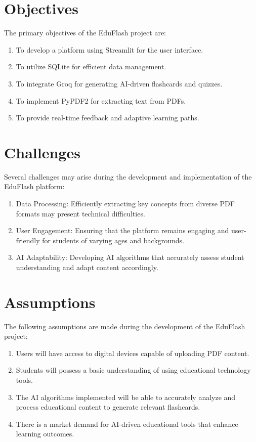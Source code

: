 \documentclass{report}
\begin{document}
\section{Objectives}
The primary objectives of the EduFlash project are:
\begin{enumerate}
    \item To develop a platform using Streamlit for the user interface.
    \item To utilize SQLite for efficient data management.
    \item To integrate Groq for generating AI-driven flashcards and quizzes.
    \item To implement PyPDF2 for extracting text from PDFs.
    \item To provide real-time feedback and adaptive learning paths.
\end{enumerate}

\section{Challenges}
Several challenges may arise during the development and implementation of the EduFlash platform:
\begin{enumerate}
    \item {Data Processing:} Efficiently extracting key concepts from diverse PDF formats may present technical difficulties.
    \item {User Engagement:} Ensuring that the platform remains engaging and user-friendly for students of varying ages and backgrounds.
    \item {AI Adaptability:} Developing AI algorithms that accurately assess student understanding and adapt content accordingly.
\end{enumerate}

\section{Assumptions}
The following assumptions are made during the development of the EduFlash project:
\begin{enumerate}
    \item Users will have access to digital devices capable of uploading PDF content.
    \item Students will possess a basic understanding of using educational technology tools.
    \item The AI algorithms implemented will be able to accurately analyze and process educational content to generate relevant flashcards.
    \item There is a market demand for AI-driven educational tools that enhance learning outcomes.
\end{enumerate}
\end{document}
